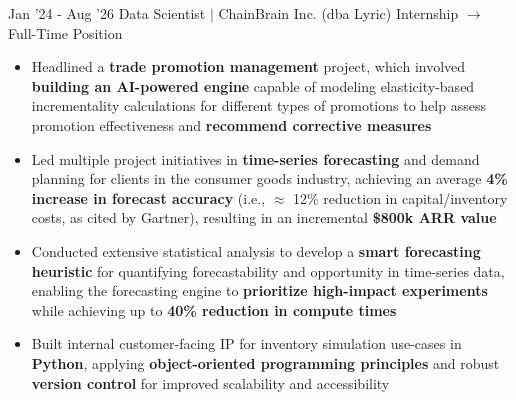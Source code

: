 \documentclass[9pt]{developercv}
\begin{document}
\vspace{-23 pt}
\vspace{-2.5pt}

\begin{entrylist}

    \entry
        {Jan '24 - Aug '26}
		{Data Scientist $\mid$ ChainBrain Inc. (dba Lyric)}
		{Internship $\rightarrow$ Full-Time Position}
		{\vspace{-10pt}
        \begin{itemize}[noitemsep,topsep=0pt,parsep=0pt,partopsep=0pt, leftmargin=9pt]
            \item Headlined a \textbf{trade promotion management} project, which involved \textbf{building an AI-powered engine} capable of modeling elasticity-based incrementality calculations for different types of promotions to help assess promotion effectiveness and \textbf{recommend corrective measures}
            \item Led multiple project initiatives in \textbf{time-series forecasting} and demand planning for clients in the consumer goods industry, achieving an average \textbf{4\% increase in forecast accuracy} (i.e., $\approx$ 12\% reduction in capital/inventory costs, as cited by Gartner), resulting in an incremental \textbf{\$800k ARR value}
            \item Conducted extensive statistical analysis to develop a \textbf{smart forecasting heuristic} for quantifying forecastability and opportunity in time-series data, enabling the forecasting engine to \textbf{prioritize high-impact experiments} while achieving up to \textbf{40\% reduction in compute times}
            \item Built internal customer-facing IP for inventory simulation use-cases in \textbf{Python}, applying \textbf{object-oriented programming principles} and robust \textbf{version control} for improved scalability and accessibility
        \end{itemize}}
    
\end{entrylist}
\end{document}

